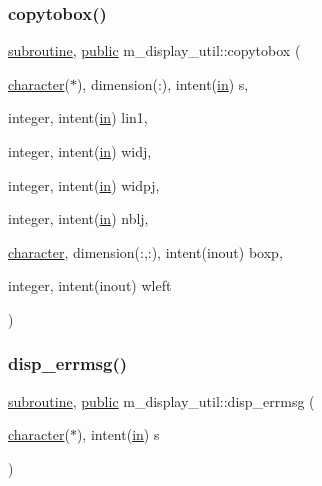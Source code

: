 \subsubsection{\texorpdfstring{copytobox()}{copytobox()}}
{\footnotesize\ttfamily \hyperlink{M__stopwatch_83_8txt_acfbcff50169d691ff02d4a123ed70482}{subroutine}, \hyperlink{M__stopwatch_83_8txt_a2f74811300c361e53b430611a7d1769f}{public} m\+\_\+display\+\_\+util\+::copytobox (\begin{DoxyParamCaption}\item[{\hyperlink{option__stopwatch_83_8txt_abd4b21fbbd175834027b5224bfe97e66}{character}($\ast$), dimension(\+:), intent(\hyperlink{M__journal_83_8txt_afce72651d1eed785a2132bee863b2f38}{in})}]{s,  }\item[{integer, intent(\hyperlink{M__journal_83_8txt_afce72651d1eed785a2132bee863b2f38}{in})}]{lin1,  }\item[{integer, intent(\hyperlink{M__journal_83_8txt_afce72651d1eed785a2132bee863b2f38}{in})}]{widj,  }\item[{integer, intent(\hyperlink{M__journal_83_8txt_afce72651d1eed785a2132bee863b2f38}{in})}]{widpj,  }\item[{integer, intent(\hyperlink{M__journal_83_8txt_afce72651d1eed785a2132bee863b2f38}{in})}]{nblj,  }\item[{\hyperlink{option__stopwatch_83_8txt_abd4b21fbbd175834027b5224bfe97e66}{character}, dimension(\+:,\+:), intent(inout)}]{boxp,  }\item[{integer, intent(inout)}]{wleft }\end{DoxyParamCaption})}

\mbox{\label{namespacem__display__util_a6bfbf2a614c2b0e059d5399eb8dda479}} 
\subsubsection{\texorpdfstring{disp\+\_\+errmsg()}{disp\_errmsg()}}
{\footnotesize\ttfamily \hyperlink{M__stopwatch_83_8txt_acfbcff50169d691ff02d4a123ed70482}{subroutine}, \hyperlink{M__stopwatch_83_8txt_a2f74811300c361e53b430611a7d1769f}{public} m\+\_\+display\+\_\+util\+::disp\+\_\+errmsg (\begin{DoxyParamCaption}\item[{\hyperlink{option__stopwatch_83_8txt_abd4b21fbbd175834027b5224bfe97e66}{character}($\ast$), intent(\hyperlink{M__journal_83_8txt_afce72651d1eed785a2132bee863b2f38}{in})}]{s }\end{DoxyParamCaption})}



